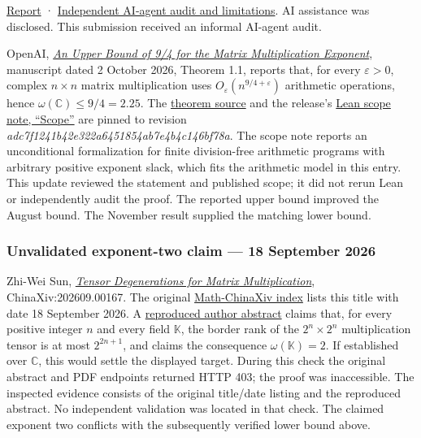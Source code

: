 \documentclass[11pt,a4paper]{article}
\makeatletter
\renewcommand{\subsection}{\Needspace{4\baselineskip}\@startsection{subsection}{2}{0pt}{9pt plus 1pt minus 1pt}{3pt}{\sffamily\bfseries\normalsize\color{ink}}}
\makeatother
\begin{document}
\href{https://github.com/ajt60gaibb/OpenProblemsInNLA/blob/main/references/holden-ac-2026-09-14/AC-01-submission.pdf}{Report}
·
\href{https://github.com/ajt60gaibb/OpenProblemsInNLA/blob/main/references/holden-ac-2026-09-14/verification/review-ac01-ac02.md}{Independent
AI-agent audit and limitations}. AI assistance was disclosed. This
submission received an informal AI-agent audit.

\subsection{Literature update ---
2026-10-06}\label{literature-update-2026-10-06}

OpenAI,
\href{https://github.com/openai/math/blob/adc7f1241b42e322a6451854ab7e4b4c146bf78a/preprints/Matrix-Multiplication-Nine-Fourths-October-2-2026/paper.pdf}{\emph{An
Upper Bound of 9/4 for the Matrix Multiplication Exponent}}, manuscript
dated 2 October 2026, Theorem 1.1, reports that, for every
\(\varepsilon>0\), complex \(n\times n\) matrix multiplication uses
\(O_{\varepsilon}(n^{9/4+\varepsilon})\) arithmetic operations, hence
\(\omega(\mathbb C)\le9/4=2.25\). The
\href{https://github.com/openai/math/blob/adc7f1241b42e322a6451854ab7e4b4c146bf78a/preprints/Matrix-Multiplication-Nine-Fourths-October-2-2026/build/paper.tex}{theorem
source} and the release's
\href{https://github.com/openai/math/blob/adc7f1241b42e322a6451854ab7e4b4c146bf78a/lean/docs/107.md}{Lean
scope note, ``Scope''} are pinned to revision
\textit{adc7f1241b42e322a6451854ab7e4b4c146bf78a}. The scope note
reports an unconditional formalization for finite division-free
arithmetic programs with arbitrary positive exponent slack, which fits
the arithmetic model in this entry. This update reviewed the statement
and published scope; it did not rerun Lean or independently audit the
proof. The reported upper bound improved the August bound. The November
result supplied the matching lower bound.

\subsubsection{Unvalidated exponent-two claim --- 18 September
2026}\label{unvalidated-exponent-two-claim-18-september-2026}

Zhi-Wei Sun, \href{https://chinaxiv.org/abs/202609.00167}{\emph{Tensor
Degenerations for Matrix Multiplication}}, ChinaXiv:202609.00167. The
original
\href{https://math.chinaxiv.org/server/mathindex.htm?locale=en}{Math-ChinaXiv
index} lists this title with date 18 September 2026. A
\href{https://chinarxiv.org/items/chinaxiv-202609.00167}{reproduced
author abstract} claims that, for every positive integer \(n\) and every
field \(\mathbb K\), the border rank of the \(2^n\times2^n\)
multiplication tensor is at most \(2^{2n+1}\), and claims the
consequence \(\omega(\mathbb K)=2\). If established over \(\mathbb C\),
this would settle the displayed target. During this check the original
abstract and PDF endpoints returned HTTP 403; the proof was
inaccessible. The inspected evidence consists of the original title/date
listing and the reproduced abstract. No independent validation was
located in that check. The claimed exponent two conflicts with the
subsequently verified lower bound above.
\end{document}
